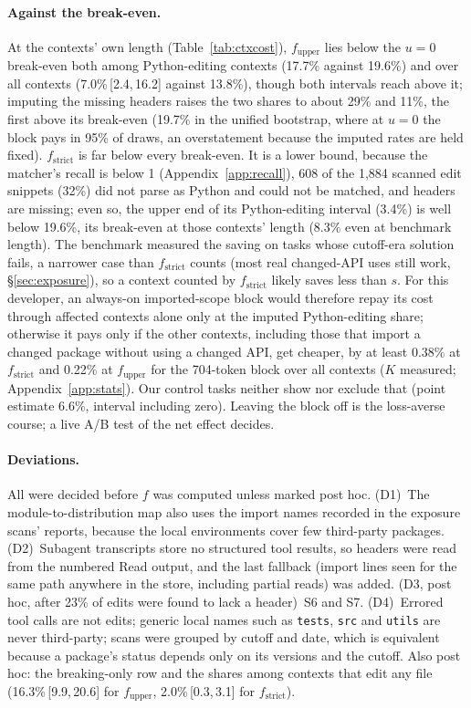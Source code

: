 \documentclass[11pt]{article}
\newcommand{\ci}[2]{\,[#1,\,#2]}
\newcommand{\code}[1]{\texttt{#1}}
\begin{document}
\paragraph{Against the break-even.}
At the contexts' own length (Table~\ref{tab:ctxcost}), $f_\text{upper}$ lies below the $u = 0$ break-even both among Python-editing contexts (17.7\% against 19.6\%) and over all contexts (7.0\%\ci{2.4}{16.2} against 13.8\%), though both intervals reach above it; imputing the missing headers raises the two shares to about 29\% and 11\%, the first above its break-even (19.7\% in the unified bootstrap, where at $u = 0$ the block pays in 95\% of draws, an overstatement because the imputed rates are held fixed).
$f_\text{strict}$ is far below every break-even. It is a lower bound, because the matcher's recall is below 1 (Appendix~\ref{app:recall}), 608 of the 1,884 scanned edit snippets (32\%) did not parse as Python and could not be matched, and headers are missing; even so, the upper end of its Python-editing interval (3.4\%) is well below 19.6\%, its break-even at those contexts' length (8.3\% even at benchmark length).
The benchmark measured the saving on tasks whose cutoff-era solution fails, a narrower case than $f_\text{strict}$ counts (most real changed-API uses still work, \S\ref{sec:exposure}), so a context counted by $f_\text{strict}$ likely saves less than $s$. For this developer, an always-on imported-scope block would therefore repay its cost through affected contexts alone only at the imputed Python-editing share; otherwise it pays only if the other contexts, including those that import a changed package without using a changed API, get cheaper, by at least 0.38\% at $f_\text{strict}$ and 0.22\% at $f_\text{upper}$ for the 704-token block over all contexts ($K$ measured; Appendix~\ref{app:stats}). Our control tasks neither show nor exclude that (point estimate 6.6\%, interval including zero). Leaving the block off is the loss-averse course; a live A/B test of the net effect decides.

\paragraph{Deviations.}
All were decided before $f$ was computed unless marked post hoc. (D1)~The module-to-distribution map also uses the import names recorded in the exposure scans' reports, because the local environments cover few third-party packages. (D2)~Subagent transcripts store no structured tool results, so headers were read from the numbered Read output, and the last fallback (import lines seen for the same path anywhere in the store, including partial reads) was added. (D3, post hoc, after 23\% of edits were found to lack a header)~S6 and S7. (D4)~Errored tool calls are not edits; generic local names such as \code{tests}, \code{src} and \code{utils} are never third-party; scans were grouped by cutoff and date, which is equivalent because a package's status depends only on its versions and the cutoff. Also post hoc: the breaking-only row and the shares among contexts that edit any file (16.3\%\ci{9.9}{20.6} for $f_\text{upper}$, 2.0\%\ci{0.3}{3.1} for $f_\text{strict}$).
\end{document}
